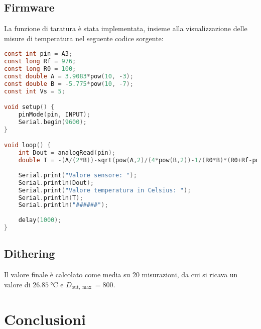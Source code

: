 \documentclass{article}
\begin{document}
\subsection{Firmware}
La funzione di taratura è stata implementata, insieme alla visualizzazione delle misure di temperatura nel seguente codice sorgente:
\begin{lstlisting}[language=C]
const int pin = A3;
const long Rf = 976;
const long R0 = 100;
const double A = 3.9083*pow(10, -3);
const double B = -5.775*pow(10, -7);
const int Vs = 5;

void setup() {
    pinMode(pin, INPUT);
    Serial.begin(9600);
}

void loop() {
    int Dout = analogRead(pin); 
    double T = -(A/(2*B))-sqrt(pow(A,2)/(4*pow(B,2))-1/(R0*B)*(R0+Rf-pow(2, 10)/Dout*Rf));
    
    Serial.print("Valore sensore: ");
    Serial.println(Dout);
    Serial.print("Valore temperatura in Celsius: ");
    Serial.println(T);
    Serial.println("######");
    
    delay(1000);
}
\end{lstlisting}
\subsection{Dithering}
Il valore finale è calcolato come media su 20 misurazioni, da cui si ricava un valore di $\SI{26.85}{\celsius}$ e $D_{\text{out}, \max}=800$.
\section{Conclusioni}
\end{document}
